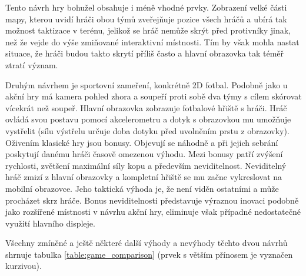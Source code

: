 \documentclass[thesis=B,czech,hidelinks]{FITthesis}[2012/06/26] %
\begin{document}
Tento návrh hry bohužel obsahuje i méně vhodné prvky. Zobrazení velké části mapy, kterou uvidí hráči obou týmů zveřejňuje pozice všech hráčů a ubírá tak možnost taktizace v terénu, jelikož se hráč nemůže skrýt před protivníky jinak, než že vejde do výše zmiňované interaktivní místnosti. Tím by však mohla nastat situace, že hráči budou takto skrytí příliš často a hlavní obrazovka tak téměř ztratí význam.

Druhým návrhem je sportovní zameření, konkrétně 2D fotbal. Podobně jako u akční hry má kamera pohled zhora a soupeří proti sobě dva týmy s cílem skórovat vícekrát než soupeř. Hlavní obrazovka zobrazuje fotbalové hřiště s hráči. Hráč ovládá svou postavu pomocí akcelerometru a dotyk s obrazovkou mu umožňuje vystřelit (sílu výstřelu určuje doba dotyku před uvolněním prstu z obrazovky). Oživením klasické hry jsou bonusy. Objevují se náhodně a při jejich sebrání poskytují danému hráči časově omezenou výhodu. Mezi bonusy patří zvýšení rychlosti, zvětšení maximální síly kopu a především neviditelnost. Neviditelný hráč zmizí z hlavní obrazovky a kompletní hřiště se mu začne vykreslovat na mobilní obrazovce. Jeho taktická výhoda je, že není viděn ostatními a může procházet skrz hráče. Bonus neviditelnosti představuje výraznou inovaci podobně jako rozšířené místnosti v návrhu akční hry, eliminuje však případné nedostatečné využití hlavního displeje.

Všechny zmíněné a ještě některé další výhody a nevýhody těchto dvou návrhů shrnuje tabulka \ref{table:game_comparison} (prvek s větším přínosem je vyznačen kurzivou).

\end{document}
